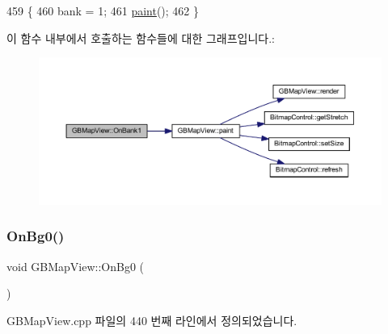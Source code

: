\begin{DoxyCode}
459 \{
460   bank = 1;
461   \mbox{\hyperlink{class_g_b_map_view_a42de669273417186b01ca6f8d06eb347}{paint}}();
462 \}
\end{DoxyCode}
이 함수 내부에서 호출하는 함수들에 대한 그래프입니다.\+:
\nopagebreak
\begin{figure}[H]
\begin{center}
\leavevmode
\includegraphics[width=350pt]{class_g_b_map_view_a7a1e36efab710bedd617b431486a42b3_cgraph}
\end{center}
\end{figure}
\mbox{\label{class_g_b_map_view_a7e9247c42189f718f173f765c4d5a5ba}} 
\subsubsection{\texorpdfstring{On\+Bg0()}{OnBg0()}}
{\footnotesize\ttfamily void G\+B\+Map\+View\+::\+On\+Bg0 (\begin{DoxyParamCaption}{ }\end{DoxyParamCaption})\hspace{0.3cm}{\ttfamily [protected]}}



G\+B\+Map\+View.\+cpp 파일의 440 번째 라인에서 정의되었습니다.


